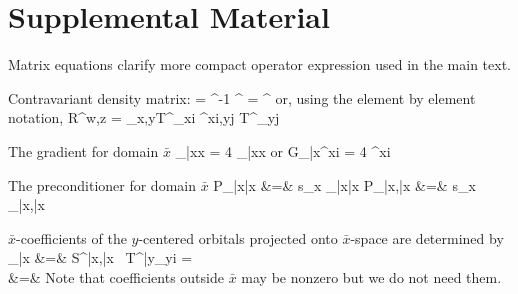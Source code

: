 \documentclass[aps,prl,twocolumn,reprint,amsmath,amssymb]{revtex4-1}
\begin{document}


\section{Supplemental Material}

Matrix equations clarify more compact operator expression used in the main text. 


Contravariant density matrix:
%
\bea
{} =  \sigma^{-1} ^{\dagger}
\sigma = ^{\dagger}  
\eea
%
or, using the element by element notation,
%
\bea
R^{w\mu,z\nu} = \sum_{x,y}{T^{\mu}}_{xi} \sigma^{xi,yj} {T^{\nu}}_{yj}
\eea

The gradient for domain $\bar{x}$
%
\bea
{}_{\bar{x}x} = 4 _{\bar{x}x}
\eea
%
or
%
\bea
{G_{\bar{x}\mu}}^{xi} = 4 ^{xi}
\eea
%

The preconditioner for domain $\bar{x}$
%
\bea
P_{\bar{x}\bar{x}} &=& s_x _{\bar{x}\bar{x}} 
\eea 
%
\bea
P_{\bar{x}\mu,\bar{x}\nu} &=& s_x _{\bar{x}\mu,\bar{x}\nu} 
\eea 

$\bar{x}$-coefficients of the $y$-centered orbitals projected onto $\bar{x}$-space are determined by
%
\bea
{}_{\bar{x}}   &=&  S^{\bar{x}\mu,\bar{x}\nu} \, {T^{\bar{y}\lambda}}_{yi} = \nonumber \\
 &=&  
\eea 
%
Note that coefficients outside $\bar{x}$ may be nonzero but we do not need them.
\end{document}
